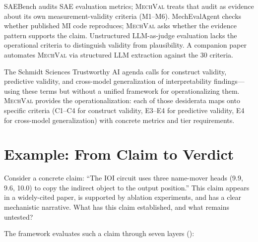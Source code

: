 \documentclass{article}
\newcommand{\mechval}{\textsc{MechVal}}
\begin{document}
SAEBench \citep{karvonen2025saebench} audits SAE evaluation metrics; \mechval{} treats that audit as evidence about its own measurement-validity criteria (M1--M6). MechEvalAgent \citep{bai2026mecheval} checks whether published MI code reproduces; \mechval{} asks whether the evidence pattern supports the claim. Unstructured LLM-as-judge evaluation \citep{zheng2023judging} lacks the operational criteria to distinguish validity from plausibility. A companion paper automates \mechval{} via structured LLM extraction against the 30 criteria.

The Schmidt Sciences Trustworthy AI agenda \citep{schmidt2026trustworthy} calls for construct validity, predictive validity, and cross-model generalization of interpretability findings---using these terms but without a unified framework for operationalizing them. \mechval{} provides the operationalization: each of those desiderata maps onto specific criteria (C1--C4 for construct validity, E3--E4 for predictive validity, E4 for cross-model generalization) with concrete metrics and tier requirements.



\section{Example: From Claim to Verdict}
\label{sec:overview}

Consider a concrete claim: ``The IOI circuit uses three name-mover heads (9.9, 9.6, 10.0) to copy the indirect object to the output position.'' This claim appears in a widely-cited paper, is supported by ablation experiments, and has a clear mechanistic narrative. What has this claim established, and what remains untested?

The framework evaluates such a claim through seven layers ():
\end{document}
